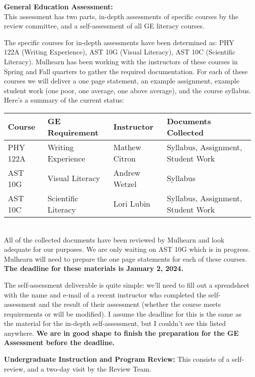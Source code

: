 \documentclass[12pt]{article}
\begin{document}
\noindent
{\bf General Education Assessment:}\\
This assessment has two parts, in-depth assessments of specific courses by the review committee, and a self-assessment of all GE literacy courses.

The specific courses for in-depth assessments have been determined as:  PHY 122A (Writing Experience), 
AST 10G (Visual Literacy), AST 10C (Scientific Literacy).  Mulhearn has been working with the instructors of these courses in Spring and Fall quarters to gather the required documentation.  For each of these courses we will deliver a one page statement, an example assignment, example student work (one poor, one average, one above average), and the course syllabus.  Here's a summary of the current status:\\[10pt]
\begin{tabular}{llll}
\hline
Course   & GE Requirement      & Instructor    & Documents Collected \\
\hline
PHY 122A & Writing Experience  & Mathew Citron & Syllabus, Assignment, Student Work \\
AST 10G  & Visual Literacy     & Andrew Wetzel & Syllabus \\
AST 10C  & Scientific Literacy & Lori Lubin    & Syllabus, Assignment, Student Work\\
\hline
\end{tabular}\\[10pt]
All of the collected documents have been reviewed by Mulhearn and look adequate for our purposes.  We are only waiting on AST 10G which is in progress.  Mulhearn will need to prepare the one page statements for each of these courses.  {\bf The deadline for these materials is January 2, 2024.}

The self-assessment deliverable is quite simple:  we'll need to fill out a spreadsheet with the name and e-mail of a recent instructor who completed the self-assessment and the result of their assessment (whether the course meets requirements or will be modified).  I assume the deadline for this is the same as the material for the in-depth self-assessment, but I couldn't see this listed anywhere.
{\bf We are in good shape to finish the preparation for the GE Assessment before the deadline.}

{\bf Undergraduate Instruction and Program Review:}  This consists of a self-review, and a two-day visit by the Review Team.
\end{document}
